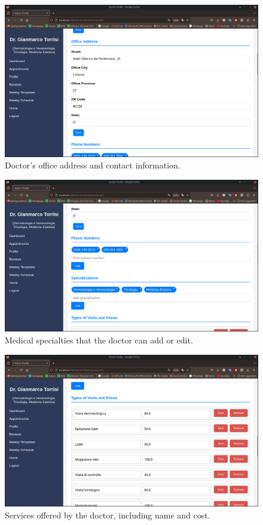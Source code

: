 \begin{figure}[!h]
	\centering
	\includegraphics[scale=0.30]{resources/screenshots/doctor_ui/address.png}
	\caption{Doctor's office address and contact information.}
	\label{fig:doctor_address}
\end{figure}

\begin{figure}[!h]
	\centering
	\includegraphics[scale=0.30]{resources/screenshots/doctor_ui/specializations.png}
	\caption{Medical specialties that the doctor can add or edit.}
	\label{fig:doctor_specialties}
\end{figure}

\begin{figure}[!h]
	\centering
	\includegraphics[scale=0.30]{resources/screenshots/doctor_ui/services.png}
	\caption{Services offered by the doctor, including name and cost.}
	\label{fig:doctor_services}
\end{figure}

